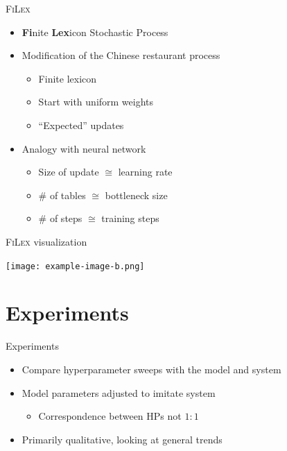 \documentclass{beamer}
\newif\ifusevizzes
\begin{document}
\begin{frame}{\textsc{FiLex}}
    \begin{itemize}
        \item \textbf{Fi}nite \textbf{Lex}icon Stochastic Process
        \item Modification of the Chinese restaurant process
            \begin{itemize}
                \item Finite lexicon
                \item Start with uniform weights
                \item ``Expected'' updates
            \end{itemize}
        \item Analogy with neural network
            \begin{itemize}
                \item Size of update $\cong$ learning rate
                \item \# of tables $\cong$ bottleneck size
                \item \# of steps $\cong$ training steps
            \end{itemize}
    \end{itemize}
\end{frame}

\begin{frame}{\textsc{FiLex} visualization}
    \begin{center}
    \ifusevizzes
          
      \else
          \texttt{[image: example-image-b.png]}
      \fi
    \end{center}
\end{frame}

\section{Experiments}

\begin{frame}{Experiments}
    \begin{itemize}
        \item Compare hyperparameter sweeps with the model and system
        \item Model parameters adjusted to imitate system
            \begin{itemize}
                \item Correspondence between HPs not $1:1$
            \end{itemize}
        \item Primarily qualitative, looking at general trends
    \end{itemize}
\end{frame}
\end{document}

